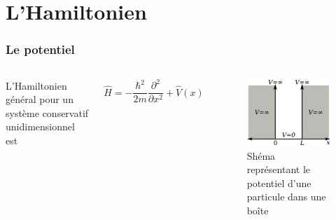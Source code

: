 \documentclass[aspectratio=169]{beamer}
\begin{document}
\section{L'Hamiltonien}
\begin{frame}
\frametitle{Le potentiel}

\begin{columns}
L'Hamiltonien général pour un système conservatif unidimensionnel est

\begin{equation}\tag{2}
\hat{H}=-\frac{\hbar^2}{2m}\frac{\partial^2}{\partial x^2}+\hat{V}(x)
\end{equation} 

\begin{figure}
\includegraphics[scale=0.4]{Pot}
\caption{Shéma représentant le potentiel d'une particule dans une boîte}
\end{figure}
\end{columns}

\end{frame}
\end{document}
